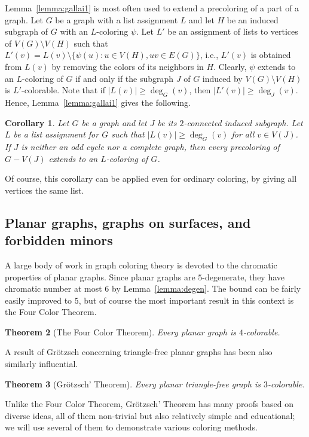 \documentclass[12pt,twoside,openright,a4paper]{book}
\newtheorem{theorem}{Theorem}[chapter]
\newtheorem{corollary}[theorem]{Corollary}
\begin{document}
Lemma~\ref{lemma:gallai1} is most often used to extend a precoloring of a part of a graph.
Let $G$ be a graph with a list assignment $L$ and let $H$ be an induced subgraph of $G$ with an $L$-coloring $\psi$.
Let $L'$ be an assignment of lists to vertices of $V(G)\setminus V(H)$ such that $L'(v)=L(v)\setminus \{\psi(u):u\in V(H),uv\in E(G)\}$,
i.e., $L'(v)$ is obtained from $L(v)$ by removing the colors of its neighbors in $H$.  Clearly, $\psi$ extends to an $L$-coloring of $G$
if and only if the subgraph $J$ of $G$ induced by $V(G)\setminus V(H)$ is $L'$-colorable.  Note that if $|L(v)|\ge \deg_G(v)$, then
$|L'(v)|\ge \deg_J(v)$.  Hence, Lemma~\ref{lemma:gallai1} gives the following.
\begin{corollary}\label{cor:gallai1}
Let $G$ be a graph and let $J$ be its $2$-connected induced subgraph.  Let $L$ be a list assignment for $G$ such that $|L(v)|\ge \deg_G(v)$ for all $v\in V(J)$.
If $J$ is neither an odd cycle nor a complete graph, then every precoloring of $G-V(J)$ extends to an $L$-coloring of $G$.
\end{corollary}
Of course, this corollary can be applied even for ordinary coloring, by giving all vertices the same list.

\subsection{Planar graphs, graphs on surfaces, and forbidden minors}

A large body of work in graph coloring theory is devoted to the chromatic properties of planar graphs.
Since planar graphs are $5$-degenerate, they have chromatic number at most $6$ by Lemma~\ref{lemma:degen}.
The bound can be fairly easily improved to $5$, but of course the most important result in this context is
the Four Color Theorem.

\begin{theorem}[The Four Color Theorem]
Every planar graph is $4$-colorable.
\end{theorem}

A result of Gr\"{o}tzsch concerning triangle-free planar graphs has been also similarly influential.
\begin{theorem}[Gr\"{o}tzsch' Theorem]
Every planar triangle-free graph is $3$-colorable.
\end{theorem}
Unlike the Four Color Theorem, Gr\"{o}tzsch' Theorem has many proofs based on diverse ideas, all of them non-trivial but also
relatively simple and educational; we will use several of them to demonstrate various coloring methods.
\end{document}
